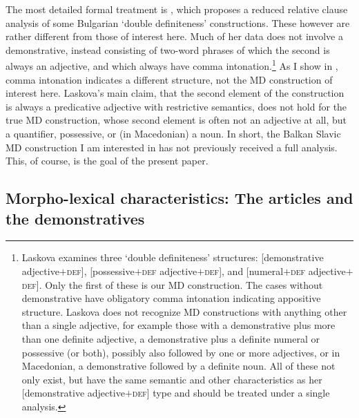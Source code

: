 \documentclass[output=paper,
colorlinks,
citecolor=brown,
newtxmath
]{langscibook}
\begin{document}
The most detailed formal treatment is \cite{Laskova2006}, which proposes a reduced relative clause analysis of some Bulgarian `double definiteness' constructions. These however are rather different from those of interest here. Much of her data does not involve a demonstrative, instead consisting of two-word phrases of which the second is always an adjective, and which always have comma intonation.\footnote{Laskova examines three `double definiteness' structures: [demonstrative adjective$+$\textsc{def}], [possessive$+$\textsc{def} adjective$+$\textsc{def}], and [numeral$+$\textsc{def} adjective$+$\textsc{def}]. Only the first of these is our MD construction. The cases without demonstrative have obligatory comma intonation indicating appositive structure. Laskova does not recognize MD constructions with anything other than a single adjective, for example those with a demonstrative plus more than one definite adjective, a demonstrative plus a definite numeral or possessive (or both), possibly also followed by one or more adjectives, or in Macedonian, a demonstrative followed by a definite noun. All of these not only exist, but have the same semantic and other characteristics as her [demonstrative adjective$+$\textsc{def}] type and should be treated under a single analysis.} As I show in , comma intonation indicates a different structure, not the MD construction of interest here. Laskova's main claim, that the second element of the construction is always a predicative adjective with restrictive semantics, does not hold for the true MD construction, whose second element is often not an adjective at all, but a quantifier, possessive, or (in Macedonian) a noun. In short, the Balkan Slavic MD construction I am interested in has not previously received a full analysis. This, of course, is the goal of the present paper.


\subsection{Morpho-lexical characteristics: The articles and the demonstratives}\label{morphological}
\end{document}
